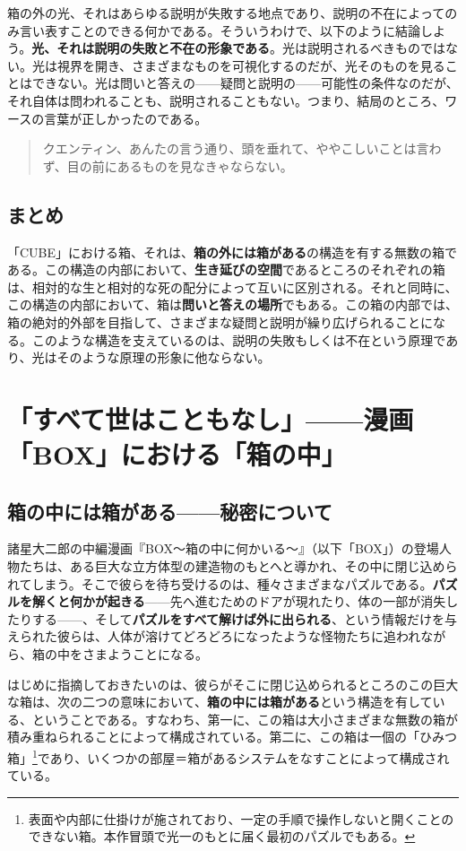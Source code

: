 \documentclass[9pt,b5j,twoside,twocolumn]{utarticle}
\begin{document}
箱の外の光、それはあらゆる説明が失敗する地点であり、説明の不在によってのみ言い表すことのできる何かである。そういうわけで、以下のように結論しよう。\textbf{光、それは説明の失敗と不在の形象である}。光は説明されるべきものではない。光は視界を開き、さまざまなものを可視化するのだが、光そのものを見ることはできない。光は問いと答えの------疑問と説明の------可能性の条件なのだが、それ自体は問われることも、説明されることもない。つまり、結局のところ、ワースの言葉が正しかったのである。

\begin{quote}
クエンティン、あんたの言う通り、頭を垂れて、ややこしいことは言わず、目の前にあるものを見なきゃならない。
\end{quote}

\subsection*{まとめ}

「CUBE」における箱、それは、\textbf{箱の外には箱がある}の構造を有する無数の箱である。この構造の内部において、\textbf{生き延びの空間}であるところのそれぞれの箱は、相対的な生と相対的な死の配分によって互いに区別される。それと同時に、この構造の内部において、箱は\textbf{問いと答えの場所}でもある。この箱の内部では、箱の絶対的外部を目指して、さまざまな疑問と説明が繰り広げられることになる。このような構造を支えているのは、説明の失敗もしくは不在という原理であり、光はそのような原理の形象に他ならない。

\section{「すべて世はこともなし」------漫画「BOX」における「箱の中」}


\subsection{\tbaselineshift =3.0pt 箱の中には箱がある------秘密について}
諸星大二郎の中編漫画『BOX～箱の中に何かいる～』（以下「BOX」）の登場人物たちは、ある巨大な立方体型の建造物のもとへと導かれ、その中に閉じ込められてしまう。そこで彼らを待ち受けるのは、種々さまざまなパズルである。\textbf{パズルを解くと何かが起きる}------先へ進むためのドアが現れたり、体の一部が消失したりする------、そして\textbf{パズルをすべて解けば外に出られる}、という情報だけを与えられた彼らは、人体が溶けてどろどろになったような怪物たちに追われながら、箱の中をさまようことになる。


はじめに指摘しておきたいのは、彼らがそこに閉じ込められるところのこの巨大な箱は、次の二つの意味において、\textbf{箱の中には箱がある}という構造を有している、ということである。すなわち、第一に、この箱は大小さまざまな無数の箱が積み重ねられることによって構成されている。第二に、この箱は一個の「ひみつ箱」\footnote{表面や内部に仕掛けが施されており、一定の手順で操作しないと開くことのできない箱。本作冒頭で光一のもとに届く最初のパズルでもある。}であり、いくつかの部屋＝箱があるシステムをなすことによって構成されている。
\end{document}
